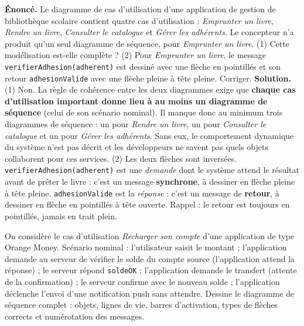 \documentclass[11pt]{article}
\begin{document}
\begin{exoresolu}
\textbf{Énoncé.} Le diagramme de cas d'utilisation d'une application de gestion de bibliothèque scolaire contient quatre cas d'utilisation : \emph{Emprunter un livre}, \emph{Rendre un livre}, \emph{Consulter le catalogue} et \emph{Gérer les adhérents}. Le concepteur n'a produit qu'un seul diagramme de séquence, pour \emph{Emprunter un livre}. (1) Cette modélisation est-elle complète ? (2) Pour \emph{Emprunter un livre}, le message \texttt{verifierAdhesion(adherent)} est dessiné avec une flèche en pointillés et son retour \texttt{adhesionValide} avec une flèche pleine à tête pleine. Corriger.
\tcblower
\textbf{Solution.} (1) Non. La règle de cohérence entre les deux diagrammes exige que \textbf{chaque cas d'utilisation important donne lieu à au moins un diagramme de séquence} (celui de son scénario nominal). Il manque donc au minimum trois diagrammes de séquence : un pour \emph{Rendre un livre}, un pour \emph{Consulter le catalogue} et un pour \emph{Gérer les adhérents}. Sans eux, le comportement dynamique du système n'est pas décrit et les développeurs ne savent pas quels objets collaborent pour ces services.
(2) Les deux flèches sont inversées. \texttt{verifierAdhesion(adherent)} est une \emph{demande} dont le système attend le résultat avant de prêter le livre : c'est un message \textbf{synchrone}, à dessiner en flèche pleine à tête pleine. \texttt{adhesionValide} est la \emph{réponse} : c'est un message de \textbf{retour}, à dessiner en flèche en pointillés à tête ouverte. Rappel : le retour est toujours en pointillés, jamais en trait plein.
\end{exoresolu}

\begin{exercice}
On considère le cas d'utilisation \emph{Recharger son compte} d'une application de type Orange Money. Scénario nominal : l'utilisateur saisit le montant ; l'application demande au serveur de vérifier le solde du compte source (l'application attend la réponse) ; le serveur répond \texttt{soldeOK} ; l'application demande le transfert (attente de la confirmation) ; le serveur confirme avec le nouveau solde ; l'application déclenche l'envoi d'une notification push sans attendre.
Dessine le diagramme de séquence complet : objets, lignes de vie, barres d'activation, types de flèches corrects et numérotation des messages.
\end{exercice}
\end{document}
